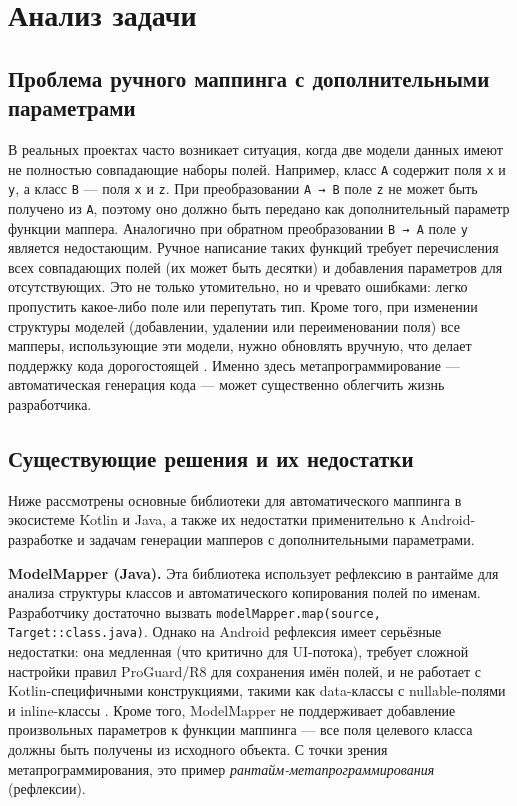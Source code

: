 \section{Анализ задачи}

\subsection{Проблема ручного маппинга с дополнительными параметрами}

В реальных проектах часто возникает ситуация, когда две модели данных имеют не полностью совпадающие наборы полей. Например, класс \texttt{A} содержит поля \texttt{x} и \texttt{y}, а класс \texttt{B} — поля \texttt{x} и \texttt{z}. При преобразовании \texttt{A → B} поле \texttt{z} не может быть получено из \texttt{A}, поэтому оно должно быть передано как дополнительный параметр функции маппера. Аналогично при обратном преобразовании \texttt{B → A} поле \texttt{y} является недостающим. Ручное написание таких функций требует перечисления всех совпадающих полей (их может быть десятки) и добавления параметров для отсутствующих. Это не только утомительно, но и чревато ошибками: легко пропустить какое-либо поле или перепутать тип. Кроме того, при изменении структуры моделей (добавлении, удалении или переименовании поля) все мапперы, использующие эти модели, нужно обновлять вручную, что делает поддержку кода дорогостоящей \cite{reff, refl}. Именно здесь метапрограммирование — автоматическая генерация кода — может существенно облегчить жизнь разработчика.

\subsection{Существующие решения и их недостатки}

Ниже рассмотрены основные библиотеки для автоматического маппинга в экосистеме Kotlin и Java, а также их недостатки применительно к Android-разработке \cite{refb, refc} и задачам генерации мапперов с дополнительными параметрами.

\textbf{ModelMapper (Java).} Эта библиотека использует рефлексию в рантайме для анализа структуры классов и автоматического копирования полей по именам. Разработчику достаточно вызвать \texttt{modelMapper.map(source, Target::class.java)}. Однако на Android рефлексия имеет серьёзные недостатки: она медленная (что критично для UI-потока), требует сложной настройки правил ProGuard/R8 для сохранения имён полей, и не работает с Kotlin-специфичными конструкциями, такими как data-классы с nullable-полями и inline-классы \cite{refa}. Кроме того, ModelMapper не поддерживает добавление произвольных параметров к функции маппинга — все поля целевого класса должны быть получены из исходного объекта. С точки зрения метапрограммирования, это пример \textit{рантайм-метапрограммирования} (рефлексии).

